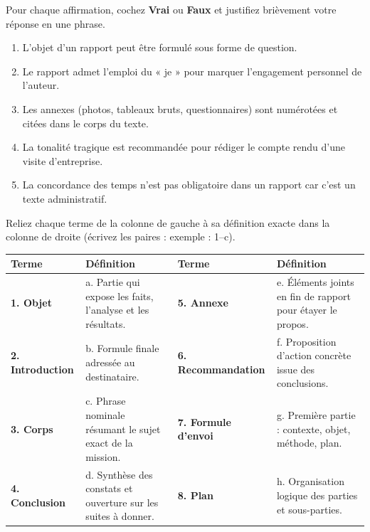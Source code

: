 \documentclass[11pt]{article}
\begin{document}
\begin{exercice}
Pour chaque affirmation, cochez \textbf{Vrai} ou \textbf{Faux} et justifiez brièvement votre réponse en une phrase.
\begin{enumerate}
    \item L'objet d'un rapport peut être formulé sous forme de question.
    \item Le rapport admet l'emploi du « je » pour marquer l'engagement personnel de l'auteur.
    \item Les annexes (photos, tableaux bruts, questionnaires) sont numérotées et citées dans le corps du texte.
    \item La tonalité tragique est recommandée pour rédiger le compte rendu d'une visite d'entreprise.
    \item La concordance des temps n'est pas obligatoire dans un rapport car c'est un texte administratif.
\end{enumerate}
\end{exercice}

\begin{exercice}
Reliez chaque terme de la colonne de gauche à sa définition exacte dans la colonne de droite (écrivez les paires : exemple : 1--c).
\begin{center}
\begin{tabularx}{\linewidth}{|>{\bfseries}l|X|>{\bfseries}l|X|}\hline
\textbf{Terme} & \textbf{Définition} & \textbf{Terme} & \textbf{Définition} \\\hline
1. Objet & a. Partie qui expose les faits, l'analyse et les résultats. & 5. Annexe & e. Éléments joints en fin de rapport pour étayer le propos. \\\hline
2. Introduction & b. Formule finale adressée au destinataire. & 6. Recommandation & f. Proposition d'action concrète issue des conclusions. \\\hline
3. Corps & c. Phrase nominale résumant le sujet exact de la mission. & 7. Formule d'envoi & g. Première partie : contexte, objet, méthode, plan. \\\hline
4. Conclusion & d. Synthèse des constats et ouverture sur les suites à donner. & 8. Plan & h. Organisation logique des parties et sous-parties. \\\hline
\end{tabularx}
\end{center}
\end{exercice}
\end{document}
